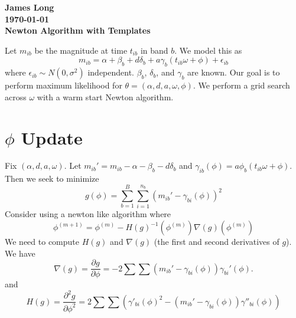 \documentclass[12pt]{article}
\title{}
\date{}
\author{}
\begin{document}
\noindent
\textbf{James Long}\\
\textbf{\today}\\
\textbf{Newton Algorithm with Templates}

Let $m_{ib}$ be the magnitude at time $t_{ib}$ in band $b$. We model this as
\begin{equation*}
m_{ib} = \alpha + \beta_b + d\delta_b + a\gamma_b(t_{ib}\omega + \phi) + \epsilon_{ib}
\end{equation*}
where $\epsilon_{ib} \sim N(0,\sigma^2)$ independent. $\beta_b$, $\delta_b$, and $\gamma_b$ are known. Our goal is to perform maximum likelihood for $\theta = (\alpha,d,a,\omega,\phi)$. We perform a grid search across $\omega$ with a warm start Newton algorithm.

\section{$\phi$ Update}

Fix $(\alpha,d,a,\omega)$. Let $m_{ib}' = m_{ib} - \alpha - \beta_b - d\delta_b$ and $\gamma_{ib}(\phi) = a\phi_b(t_{ib}\omega + \phi)$. Then we seek to minimize
\begin{equation*}
g(\phi) = \sum_{b=1}^B\sum_{i=1}^{n_b} (m_{ib}' - \gamma_{bi}(\phi))^2
\end{equation*}
Consider using a newton like algorithm where
\begin{equation*}
\phi^{(m+1)} = \phi^{(m)} - H(g)^{-1}(\phi^{(m)})\nabla(g)(\phi^{(m)})
\end{equation*}
We need to compute $H(g)$ and $\nabla(g)$ (the first and second derivatives of $g$). We have
\begin{equation*}
\nabla(g) = \frac{\partial g}{\partial \phi} = - 2\sum \sum (m_{ib}' - \gamma_{bi}(\phi))\gamma_{bi}'(\phi).
\end{equation*}
and
\begin{equation*}
H(g) = \frac{\partial^2 g}{\partial \phi^2} = 2 \sum \sum \left(\gamma'_{bi}(\phi)^2 - (m_{ib}' - \gamma_{bi}(\phi))\gamma''_{bi}(\phi)\right)
\end{equation*}
%
%
\end{document}
